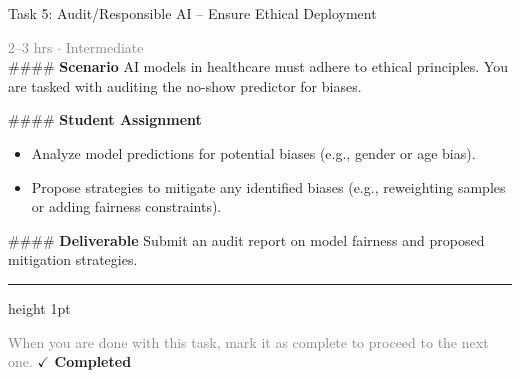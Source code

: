 \documentclass[10pt,a4paper]{article}
\begin{document}
\begin{taskbox}{Task 5: Audit/Responsible AI – Ensure Ethical Deployment}

    {\small \textcolor{gray}{2--3 hrs $\cdot$ Intermediate}}\\[12pt]

    \#\#\#\# \textbf{Scenario}  
AI models in healthcare must adhere to ethical principles. You are tasked with auditing the no-show predictor for biases.  

\#\#\#\# \textbf{Student Assignment}  
\begin{itemize}
    \item Analyze model predictions for potential biases (e.g., gender or age bias).  
    \item Propose strategies to mitigate any identified biases (e.g., reweighting samples or adding fairness constraints).  
\end{itemize}

\#\#\#\# \textbf{Deliverable}  
Submit an audit report on model fairness and proposed mitigation strategies.\par

    \vspace{16pt}

    \textcolor{cardBorder}{\hrule height 1pt}\vspace{8pt}

    \small \textcolor{gray}{When you are done with this task, mark it as complete to proceed to the next one.} \hfill \textbf{\textcolor{brandDark}{$\checkmark$ Completed}}

\end{taskbox}
\end{document}
